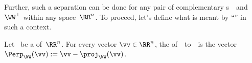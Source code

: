 \begin{reduce}
Further, such a separation can be done for any pair of complementary s~\WW\ and~\(\WW^\perp\) within any space~\(\RR^n\).
To proceed, let's define what is meant by ``\Perp'' in such a context.


\begin{definition} \label{def:perpn}
Let \WW\ be a  of~\(\RR^n\).
For every vector \(\vv\in\RR^n\), the  of~\vv\  to~\WW\ is the vector
\(\Perp_\WW(\vv):=\vv-\proj_{\WW}(\vv)\).
\end{definition}





\end{reduce}
